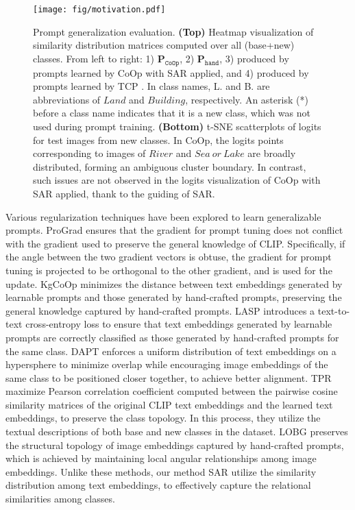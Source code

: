 \begin{figure*}[t]
    \setlength{\abovecaptionskip}{0.1cm}  
    \setlength{\belowcaptionskip}{-0.3cm} 
    \centering
    \texttt{[image: fig/motivation.pdf]} 
    \caption{Prompt generalization evaluation. \textbf{(Top)} Heatmap visualization of similarity distribution matrices computed over all (base+new) classes. From left to right: 1) $\mathbf{P}_{\mathtt{CoOp}}$, 2) $\mathbf{P}_{\mathtt{hand}}$, 3) produced by prompts learned by CoOp with SAR applied, and 4) produced by prompts learned by TCP \cite{yao2024tcp}. In class names, \textup{L.} and \textup{B.} are abbreviations of $Land$ and $Building$, respectively. An asterisk (*) before a class name indicates that it is a new class, which was not used during prompt training. \textbf{(Bottom)} t-SNE scatterplots of logits for test images from new classes. In CoOp, the logits points corresponding to images of $River$ and $Sea\ or\ Lake$ are broadly distributed, forming an ambiguous cluster boundary. In contrast, such issues are not observed in the logits visualization of CoOp with SAR applied, thank to the guiding of SAR.}
    \label{fig:motivation}
\end{figure*}

 Various regularization techniques have been explored to learn generalizable prompts. ProGrad \cite{zhu2023prompt} ensures that the gradient for prompt tuning does not conflict with the gradient used to preserve the general knowledge of CLIP. Specifically, if the angle between the two gradient vectors is obtuse, the gradient for prompt tuning is projected to be orthogonal to the other gradient, and is used for the update. KgCoOp \cite{yao2023kgcoop} minimizes the distance between text embeddings generated by learnable prompts and those generated by hand-crafted prompts, preserving the general knowledge captured by hand-crafted prompts. LASP \cite{bulat2023lasp} introduces a text-to-text cross-entropy loss to ensure that text embeddings generated by learnable prompts are correctly classified as those generated by hand-crafted prompts for the same class. DAPT \cite{cho2023distribution} enforces a uniform distribution of text embeddings on a hypersphere to minimize overlap while encouraging image embeddings of the same class to be positioned closer together, to achieve better alignment. TPR \cite{chentpr} maximize Pearson correlation coefficient computed between the pairwise cosine similarity matrices of the original CLIP text embeddings and the learned text embeddings, to preserve the class topology. In this process, they utilize the textual descriptions of both base and new classes in the dataset. LOBG \cite{ding2024lobg} preserves the structural topology of image embeddings captured by hand-crafted prompts, which is achieved by maintaining local angular relationships among image embeddings. Unlike these methods, our method SAR utilize the similarity distribution among text embeddings, to effectively capture the relational similarities among classes.